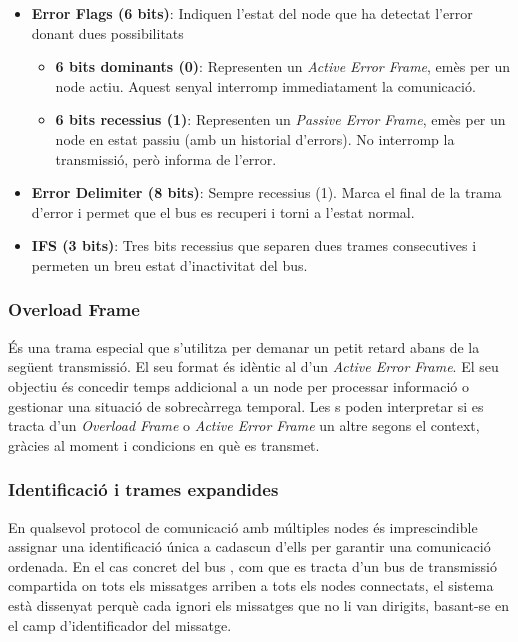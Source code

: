 \documentclass{tfgitic}[2024/07/01]
\begin{document}
\begin{itemize}
  \item \textbf{Error Flags (6 bits)}: Indiquen l'estat del node que ha detectat l'error donant dues possibilitats

  \begin{itemize}
  \item \textbf{6 bits dominants (0)}: Representen un \textit{Active Error Frame}, emès per un node actiu. Aquest senyal interromp immediatament la comunicació.

  \item \textbf{6 bits recessius (1)}: Representen un \textit{Passive Error Frame}, emès per un node en estat passiu (amb un historial d'errors). No interromp la 
  transmissió, però informa de l'error.
  
  \end{itemize} 
  
  \item \textbf{Error Delimiter (8 bits)}: Sempre recessius (1). Marca el final de la trama d'error i permet que el bus es recuperi i torni a l'estat normal.
  
  \item \textbf{IFS (3 bits)}: Tres bits recessius que separen dues trames consecutives i permeten un breu estat d'inactivitat del bus.
\end{itemize} 

\subsubsection{Overload Frame}

És una trama especial que s'utilitza per demanar un petit retard abans de la següent transmissió. El seu format és idèntic al d'un \textit{Active Error Frame}. 
El seu objectiu és concedir temps addicional a un node per processar informació o gestionar una situació de sobrecàrrega temporal. Les s poden interpretar 
si es tracta d'un \textit{Overload Frame} o \textit{Active Error Frame} un altre segons el context, gràcies al moment i condicions en què es transmet.

\subsubsection{Identificació i trames expandides}

En qualsevol protocol de comunicació amb múltiples nodes és imprescindible assignar una identificació única a cadascun d'ells per garantir una comunicació ordenada. 
En el cas concret del bus , com que es tracta d'un bus de transmissió compartida on tots els missatges arriben a tots els nodes connectats, el sistema està dissenyat 
perquè cada  ignori els missatges que no li van dirigits, basant-se en el camp d'identificador del missatge.
\end{document}
